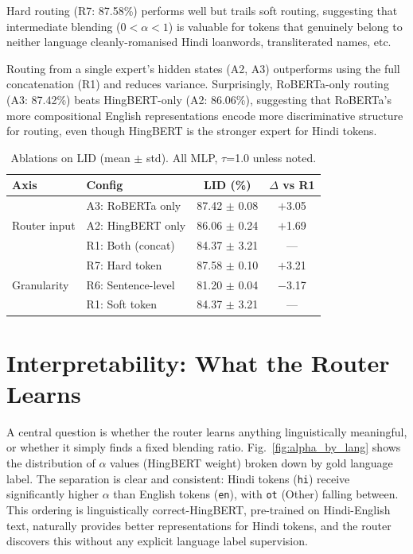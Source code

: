\documentclass[conference]{IEEEtran}
\begin{document}
Hard routing (R7: 87.58\%) performs well but trails soft routing, suggesting that intermediate blending ($0 < \alpha < 1$) is valuable for tokens that genuinely belong to neither language cleanly-romanised Hindi loanwords, transliterated names, etc.

Routing from a single expert's hidden states (A2, A3) outperforms using the full concatenation (R1) and reduces variance. Surprisingly, RoBERTa-only routing (A3: 87.42\%) beats HingBERT-only (A2: 86.06\%), suggesting that RoBERTa's more compositional English representations encode more discriminative structure for routing, even though HingBERT is the stronger expert for Hindi tokens.

\begin{table}[t]
\centering
\caption{Ablations on LID (mean $\pm$ std). All MLP, $\tau$=1.0 unless noted.}
\label{tab:ablations}
\setlength{\tabcolsep}{4pt}
\begin{tabular}{llcc}
\toprule
\textbf{Axis} & \textbf{Config} & \textbf{LID (\%)} & \textbf{$\Delta$ vs R1} \\
\midrule
\multirow{3}{*}{Router input}
  & A3: RoBERTa only   & 87.42 $\pm$ 0.08 & $+$3.05 \\
  & A2: HingBERT only  & 86.06 $\pm$ 0.24 & $+$1.69 \\
  & R1: Both (concat)  & 84.37 $\pm$ 3.21 & --- \\
\midrule
\multirow{3}{*}{Granularity}
  & R7: Hard token     & 87.58 $\pm$ 0.10 & $+$3.21 \\
  & R6: Sentence-level & 81.20 $\pm$ 0.04 & $-$3.17 \\
  & R1: Soft token     & 84.37 $\pm$ 3.21 & --- \\
\bottomrule
\end{tabular}
\end{table}

\section{Interpretability: What the Router Learns}

A central question is whether the router learns anything linguistically meaningful, or whether it simply finds a fixed blending ratio. Fig.~\ref{fig:alpha_by_lang} shows the distribution of $\alpha$ values (HingBERT weight) broken down by gold language label. The separation is clear and consistent: Hindi tokens (\texttt{hi}) receive significantly higher $\alpha$ than English tokens (\texttt{en}), with \texttt{ot} (Other) falling between. This ordering is linguistically correct-HingBERT, pre-trained on Hindi-English text, naturally provides better representations for Hindi tokens, and the router discovers this without any explicit language label supervision.
\end{document}
